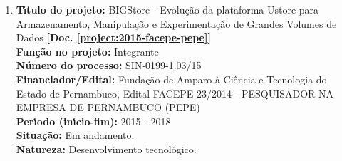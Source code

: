\documentclass[a4paper,oneside,10pt]{article}
\newcounter{document}%
\newcommand\Doc{{\addtocounter{document}{1}\mbox{\sffamily\bfseries [Doc. \arabic{document}]}}}
\begin{document}
\begin{enumerate}
\renewcommand{\labelenumi}{{\large\bfseries\arabic{enumi}.}}


\item \textbf{T\'{\i}tulo do projeto:} BIGStore - Evolução da plataforma Ustore para Armazenamento, Manipulação e Experimentação de Grandes Volumes de Dados \textbf{[Doc. \ref{project:2015-facepe-pepe}]}\\
      \textbf{Fun\c{c}\~{a}o no projeto:} Integrante\\
      \textbf{N\'{u}mero do processo:} SIN-0199-1.03/15\\
      \textbf{Financiador/Edital:} Fundação de Amparo à Ciência e Tecnologia do Estado de Pernambuco, Edital FACEPE 23/2014 - PESQUISADOR NA EMPRESA DE PERNAMBUCO (PEPE)\\
      \textbf{Per\'{\i}odo (in\'{\i}cio-fim):} 2015 - 2018\\
      \textbf{Situação:} Em andamento.\\
      \textbf{Natureza:} Desenvolvimento tecnológico.


\end{enumerate}
\end{document}
